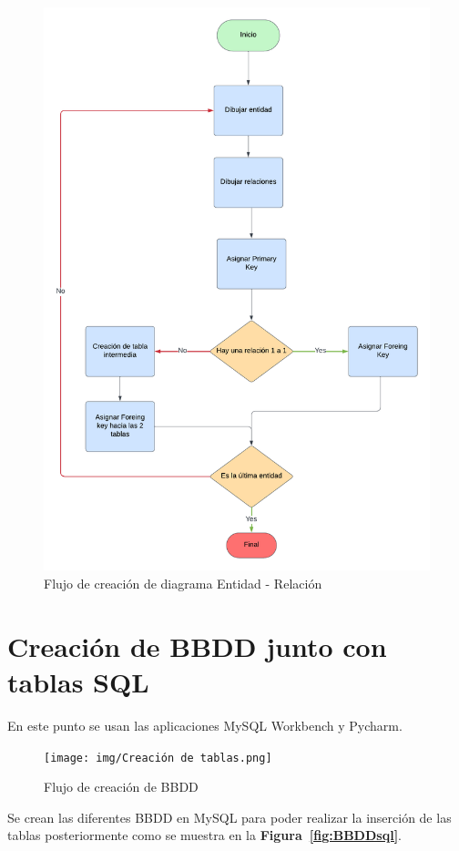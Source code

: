 \documentclass[a4paper, 12pt]{book}
\begin{document}
\begin{figure}
	\centering
	\includegraphics[width=15cm, keepaspectratio]{img/Creacion diagrama.png}
	\caption{Flujo de creación de diagrama Entidad - Relación}
	\label{fig:flujo creacion de diagrama}
\end{figure}

\section{Creación de BBDD junto con tablas SQL} 
\label{sec:creacion_BBDD}
En este punto se usan las aplicaciones MySQL Workbench y Pycharm.
\begin{figure}
	\centering
	\texttt{[image: img/Creación de tablas.png]}
	\caption{Flujo de creación de BBDD}
	\label{fig:flujo creacion BBDD}
\end{figure}
Se crean las diferentes BBDD en MySQL para poder realizar la inserción de las tablas posteriormente como se muestra en la \textbf {Figura~\ref{fig:BBDDsql}}.
\end{document}
